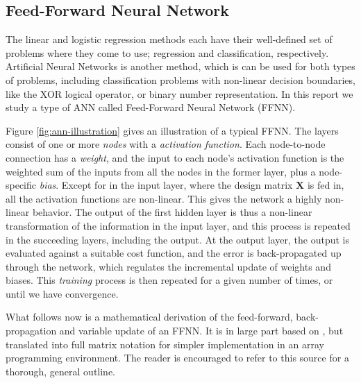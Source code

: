 \documentclass[]{article}
\begin{document}
\subsection{Feed-Forward Neural Network}
The linear and logistic regression methods each have their well-defined set of problems where they come to use; regression and classification, respectively. Artificial Neural Networks is another method, which is can be used for both types of problems, including classification problems with non-linear decision boundaries, like the XOR logical operator, or binary number representation. In this report we study a type of ANN called Feed-Forward Neural Network (FFNN).

Figure \ref{fig:ann-illustration} gives an illustration of a typical FFNN. The layers consist of one or more \textit{nodes} with a \textit{activation function}. Each node-to-node connection has a \textit{weight}, and the input to each node's activation function is the weighted sum of the inputs from all the nodes in the former layer, plus a node-specific \textit{bias}. Except for in the input layer, where the design matrix $\mathbf{X}$ is fed in, all the activation functions are non-linear. This gives the network a highly non-linear behavior. The output of the first hidden layer is thus a non-linear transformation of the information in the input layer, and this process is repeated in the succeeding layers, including the output. At the output layer, the output is evaluated against a suitable cost function, and the error is back-propagated up through the network, which regulates the incremental update of weights and biases. This \textit{training} process is then repeated for a given number of times, or until we have convergence.

\vspace{5mm}

What follows now is a mathematical derivation of the feed-forward, back-propagation and variable update of an FFNN. It is in large part based on \cite{fys-stk4155-notes}, but translated into full matrix notation for simpler implementation in an array programming environment. The reader is encouraged to refer to this source for a thorough, general outline.
\end{document}
